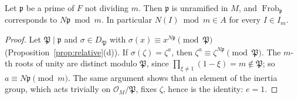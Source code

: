 \begin{lemma}\label{lem:cyclofrob}
Let $\mathfrak p$ be a prime of $F$ not dividing $m$. Then $\mathfrak p$ is unramified in $M$, and $\operatorname{Frob}_{\mathfrak p}$
corresponds to $N\mathfrak p\bmod m$. In particular $N(I)\bmod m\in A$ for every $I\in I_m$.
\end{lemma}
\begin{proof}
Let $\mathfrak P\mid\mathfrak p$ and $\sigma\in D_{\mathfrak P}$ with $\sigma(x)\equiv x^{N\mathfrak p}\pmod{\mathfrak P}$
(Proposition~\ref{prop:relative}(d)). If $\sigma(\zeta)=\zeta^a$, then $\zeta^a\equiv\zeta^{N\mathfrak p}\pmod{\mathfrak P}$. The $m$-th roots
of unity are distinct modulo $\mathfrak P$, since $\prod_{\xi\ne1}(1-\xi)=m\notin\mathfrak P$; so $a\equiv N\mathfrak p\pmod m$. The same argument
shows that an element of the inertia group, which acts trivially on $\mathcal O_M/\mathfrak P$, fixes $\zeta$, hence is the identity: $e=1$.
\end{proof}

